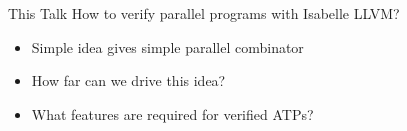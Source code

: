 \documentclass[fleqn]{beamer}
\begin{document}
\begin{frame}{This Talk}
  How to verify parallel programs with Isabelle LLVM?
  \begin{itemize}
   \item Simple idea gives simple parallel combinator
   \item How far can we drive this idea?
   \item What features are required for verified ATPs?

  \end{itemize}



\end{frame}
\end{document}

